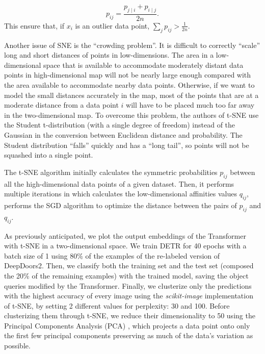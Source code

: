 \begin{equation}
 p_{i j} = \frac{p_{j \mid i} + p_{i \mid j}}{2n}.
\end{equation}
This ensure that, if $x_i$ is an outlier data point, $\sum_{j} p_{i j} > \frac{1}{2n}$.

Another issue of SNE is the ``crowding problem''. It is difficult to correctly ``scale'' long and short distances of points in low-dimensions. The area in a low-dimensional space that is available to accommodate moderately distant
data points in high-dimensional map will not be nearly large enough compared with the area available to accommodate nearby data points. Otherwise, if we want to model the small distances accurately in the map, most of the points that are at a moderate distance from a data point $i$ will have to be placed much too far away in the two-dimensional map. To overcome this problem, the authors of t-SNE use the Student t-distribution (with a single degree of freedom) instead of the Gaussian in the conversion between Euclidean distance and probability. The Student distribution ``falls'' quickly and has a ``long tail'', so points will not be squashed into a single point. 

The t-SNE algorithm initially calculates the symmetric probabilities $p_{i j}$ between all the high-dimensional data points of a given dataset. Then, it performs multiple iterations in which calculates the low-dimensional affinities values $q_{i j}$, performs the SGD algorithm to optimize the distance between the pairs of $p_{i j}$ and $q_{i j}$.

As previously anticipated, we plot the output embeddings of the Transformer with t-SNE in a two-dimensional space. We train DETR for 40 epochs with a batch size of 1 using 80\% of the examples of the re-labeled version of DeepDoors2. Then, we classify both the training set and the test set (composed the 20\% of the remaining examples) with the trained model, saving the object queries modified by the Transformer. Finally, we clusterize only the predictions with the highest accuracy of every image using the \textit{scikit-image} implementation of t-SNE, by setting 2 different values for perplexity: 30 and 100. Before clusterizing them through t-SNE, we reduce their dimensionality to 50 using the Principal Components Analysis (PCA) \cite{pca}, which projects a data point onto only the first few principal components preserving as much of the data's variation as possible. 

